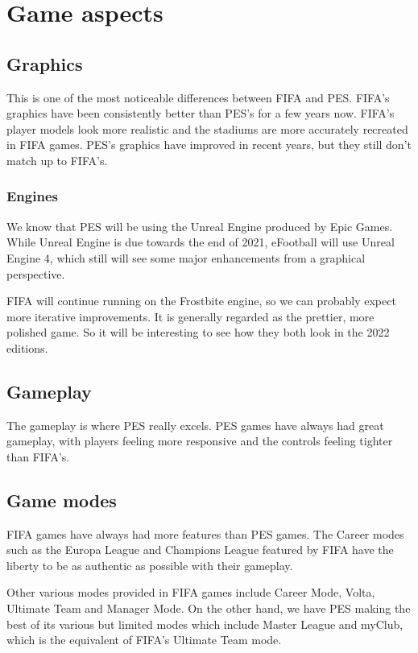 \documentclass[12pt,twoside,english,a4paper]{article}
\begin{document}
\section{Game aspects} \label{aspects}




\subsection{Graphics} \label{aspects: graphics}
This is one of the most noticeable differences between FIFA and PES. FIFA’s graphics have been consistently better than PES’s for a few years now. FIFA’s player models look more realistic and the stadiums are more accurately recreated in FIFA games. PES’s graphics have improved in recent years, but they still don’t match up to FIFA’s.

\subsubsection{Engines}

We know that PES will be using the Unreal Engine produced by Epic Games. While Unreal Engine is due towards the end of 2021, eFootball will use Unreal Engine 4, which still will see some major enhancements from a graphical perspective.

FIFA will continue running on the Frostbite engine, so we can probably expect more iterative improvements. It is generally regarded as the prettier, more polished game. So it will be interesting to see how they both look in the 2022 editions.

\subsection{Gameplay} \label{aspects: gameplay}
The gameplay is where PES really excels. PES games have always had great gameplay, with players feeling more responsive and the controls feeling tighter than FIFA’s.

\subsection{Game modes} \label{aspects: modes}
FIFA games have always had more features than PES games. The Career modes such as the Europa League and Champions League featured by FIFA have the liberty to be as authentic as possible with their gameplay.

Other various modes provided in FIFA games include Career Mode, Volta, Ultimate Team and Manager Mode. On the other hand, we have PES making the best of its various but limited modes which include Master League and myClub, which is the equivalent of FIFA’s Ultimate Team mode.
\end{document}
